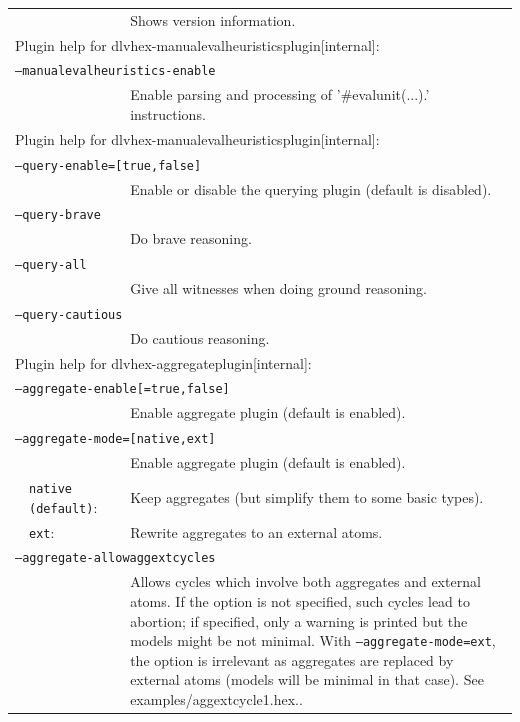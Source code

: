 \documentclass[a4paper, titlepage]{article}
\begin{document}
\begin{center}
\begin{longtable}{p{2.2cm}  p{2.5cm} p{0.6cm} p{6.3cm}  }
& & & Shows version information.\\
\multicolumn{4}{l}{Plugin help for dlvhex-manualevalheuristicsplugin[internal]:}\\
\multicolumn{4}{l}{\texttt{--manualevalheuristics-enable}}\\
& & & Enable parsing and processing of '\#evalunit(...).' instructions.\\
\multicolumn{4}{l}{Plugin help for dlvhex-manualevalheuristicsplugin[internal]:}\\
\multicolumn{4}{l}{\texttt{--query-enable=[true,false]}}\\
& & & Enable or disable the querying plugin (default is disabled).\\
\multicolumn{4}{l}{\texttt{--query-brave}}\\
& & & Do brave reasoning.\\
\multicolumn{4}{l}{\texttt{--query-all}}\\
& & & Give all witnesses when doing ground reasoning.\\
\multicolumn{4}{l}{\texttt{--query-cautious}}\\
& & & Do cautious reasoning.\\
\multicolumn{4}{l}{Plugin help for dlvhex-aggregateplugin[internal]:}\\
\multicolumn{4}{l}{\texttt{--aggregate-enable[=true,false]}}\\
& & & Enable aggregate plugin (default is enabled).\\
\multicolumn{4}{l}{\texttt{--aggregate-mode=[native,ext]}}\\
& & & Enable aggregate plugin (default is enabled).\\
&\texttt{native (default)}:&& Keep aggregates (but simplify them to some basic types).\\
&\texttt{ext}:&& Rewrite aggregates to an external atoms.\\
\multicolumn{4}{l}{\texttt{--aggregate-allowaggextcycles}}\\
& & & Allows cycles which involve both aggregates and external atoms. If the option is not specified, such cycles lead to abortion; if specified, only a warning is printed but the models might be not minimal. With \texttt{--aggregate-mode=ext}, the option is irrelevant as aggregates are replaced by external atoms (models will be minimal in that case). See examples/aggextcycle1.hex..\\

\end{longtable}
\end{center}
\end{document}
